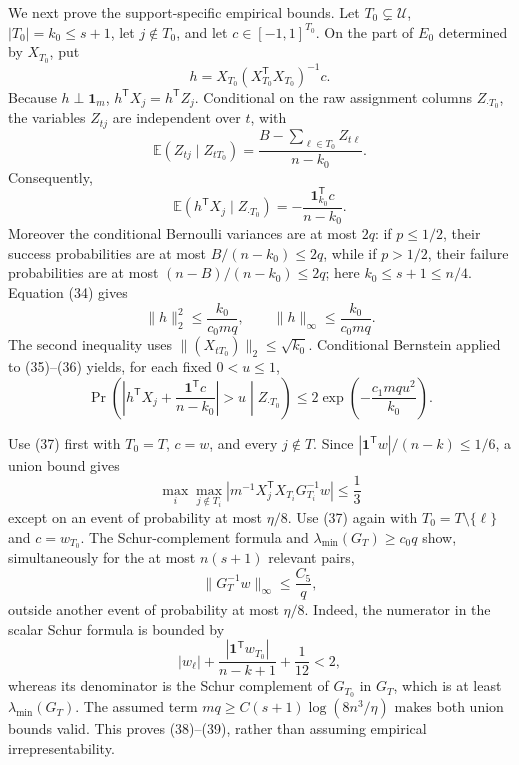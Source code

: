 We next prove the support-specific empirical bounds.  Let \(T_0\subsetneq\mathcal U\), \(|T_0|=k_0\le s+1\), let \(j\notin T_0\), and let \(c\in[-1,1]^{T_0}\).  On the part of \(E_0\) determined by \(X_{T_0}\), put
\[
 h=X_{T_0}(X_{T_0}^{\mathsf T}X_{T_0})^{-1}c.
\]
Because \(h\perp\mathbf1_m\), \(h^{\mathsf T}X_j=h^{\mathsf T}Z_j\).  Conditional on the raw assignment columns \(Z_{\cdot T_0}\), the variables \(Z_{tj}\) are independent over \(t\), with
\[
 \mathbb E(Z_{tj}\mid Z_{tT_0})
 =\frac{B-\sum_{\ell\in T_0}Z_{t\ell}}{n-k_0}.
\]
Consequently,
\[
 \mathbb E(h^{\mathsf T}X_j\mid Z_{\cdot T_0})
 =-\frac{\mathbf1_{k_0}^{\mathsf T}c}{n-k_0}.
 \tag{35}
\]
Moreover the conditional Bernoulli variances are at most \(2q\): if \(p\le1/2\), their success probabilities are at most \(B/(n-k_0)\le2q\), while if \(p>1/2\), their failure probabilities are at most \((n-B)/(n-k_0)\le2q\); here \(k_0\le s+1\le n/4\).  Equation (34) gives
\[
 \lVert h\rVert_2^2\le\frac{k_0}{c_0mq},
 \qquad
 \lVert h\rVert_\infty\le\frac{k_0}{c_0mq}.
 \tag{36}
\]
The second inequality uses \(\lVert (X_{tT_0})\rVert_2\le\sqrt{k_0}\).  Conditional Bernstein applied to (35)--(36) yields, for each fixed \(0<u\le1\),
\[
 \Pr\!\left(
  \left|h^{\mathsf T}X_j+\frac{\mathbf1^{\mathsf T}c}{n-k_0}\right|>u
  \middle|Z_{\cdot T_0}\right)
 \le2\exp\!\left(-\frac{c_1mqu^2}{k_0}\right).
 \tag{37}
\]

Use (37) first with \(T_0=T\), \(c=w\), and every \(j\notin T\).  Since \(|\mathbf1^{\mathsf T}w|/(n-k)\le1/6\), a union bound gives
\[
 \max_{i}\max_{j\notin T_i}
 \left|m^{-1}X_j^{\mathsf T}X_{T_i}G_{T_i}^{-1}w\right|
 \le\frac13
 \tag{38}
\]
except on an event of probability at most \(\eta/8\).  Use (37) again with \(T_0=T\setminus\{\ell\}\) and \(c=w_{T_0}\).  The Schur-complement formula and \(\lambda_{\min}(G_T)\ge c_0q\) show, simultaneously for the at most \(n(s+1)\) relevant pairs,
\[
 \lVert G_T^{-1}w\rVert_\infty\le\frac{C_5}{q},
 \tag{39}
\]
outside another event of probability at most \(\eta/8\).  Indeed, the numerator in the scalar Schur formula is bounded by
\[
 |w_\ell|+\frac{|\mathbf1^{\mathsf T}w_{T_0}|}{n-k+1}+\frac1{12}<2,
\]
whereas its denominator is the Schur complement of \(G_{T_0}\) in \(G_T\), which is at least \(\lambda_{\min}(G_T)\).  The assumed term \(mq\ge C(s+1)\log(8n^3/\eta)\) makes both union bounds valid.  This proves (38)--(39), rather than assuming empirical irrepresentability.

